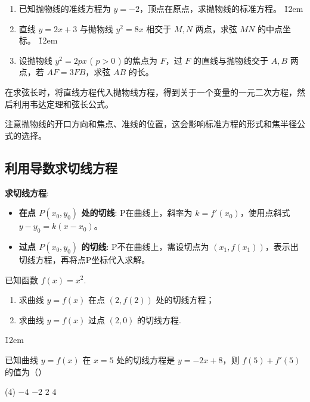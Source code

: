 \begin{problem}
\begin{enumerate}
    \item 已知抛物线的准线方程为 $y = -2$，顶点在原点，求抛物线的标准方程。
          \v{12em}
    \item 直线 $y = 2x + 3$ 与抛物线 $y^2 = 8x$ 相交于 $M, N$ 两点，求弦 $MN$ 的中点坐标。
          \v{12em}
    \item 设抛物线 $y^2 = 2px$ ( $p>0$ ) 的焦点为 $F$，过 $F$ 的直线与抛物线交于 $A, B$ 两点，若 $AF = 3FB$，求弦 $AB$ 的长。
\end{enumerate}
\end{problem}
\begin{tips}
    在求弦长时，将直线方程代入抛物线方程，得到关于一个变量的一元二次方程，然后利用韦达定理和弦长公式。
\end{tips}
\begin{warning}
    注意抛物线的开口方向和焦点、准线的位置，这会影响标准方程的形式和焦半径公式的选择。
\end{warning}
\subsection{利用导数求切线方程}

\begin{theorem}
    \textbf{求切线方程}:
    \begin{itemize}
        \item \textbf{在点 $P(x_0, y_0)$ 处的切线}: P在曲线上，斜率为 $k=f'(x_0)$，使用点斜式 $y-y_0 = k(x-x_0)$。
        \item \textbf{过点 $P(x_0, y_0)$ 的切线}: P不在曲线上，需设切点为 $(x_1, f(x_1))$，表示出切线方程，再将点P坐标代入求解。
    \end{itemize}
\end{theorem}
\begin{example}
    已知函数 $f(x) = x^{2}$.
    \begin{enumerate}
        \item[(1)] 求曲线 $y = f(x)$ 在点 $(2,f(2))$ 处的切线方程；
        \item[(2)] 求曲线 $y = f(x)$ 过点 $(2,0)$ 的切线方程.
    \end{enumerate}
\end{example}

\v{12em}

\begin{example}
    已知曲线 $y = f(x)$ 在 $x = 5$ 处的切线方程是 $y = - 2x + 8$，则 $f(5) + f'(5)$ 的值为（\quad）
    \begin{tasks}(4)
        \task $- 4$ \task $- 2$ \task $2$ \task $4$
    \end{tasks}
\end{example}


